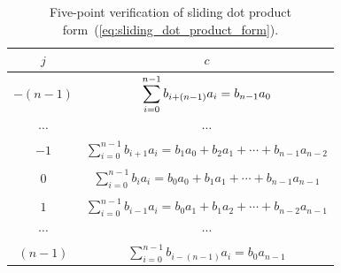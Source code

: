 \begin{table}[htb]
\label{tab:five_samples} 
\caption{Five-point verification of sliding dot product
form~(\ref{eq:sliding_dot_product_form}).}
\centering
\begin{tabular}{|c|c|}
\hline
$j$ & $c$ \\ \hline\hline
$-(n-1)$ & 
  $\displaystyle\sum_{i=0}^{n-1} 
    b_{i+(n-1)} a_i = b_{n-1} a_0$ \\  
$\cdots$ & $\cdots$ \\
$-1$ & 
  $\sum_{i=0}^{n-1} 
             b_{i+1} a_i = b_1 a_0 + b_2 a_1 + \cdots + 
	     b_{n-1} a_{n-2}$ \\  
	     & \\
$0$ & 
  $\sum_{i=0}^{n-1} b_i a_i = b_0 a_0 + b_1 a_1 + \cdots + 
  b_{n-1} a_{n-1}$ \\
  & \\
$1$ & 
  $\sum_{i=0}^{n-1} 
             b_{i-1} a_i = b_0 a_1 + b_1 a_2 + \cdots + 
	     b_{n-2} a_{n-1}$ \\  
$\cdots$ & $\cdots$ \\
$(n-1)$ & 
  $\sum_{i=0}^{n-1} b_{i-(n-1)} a_i = b_0 a_{n-1}$   
 \\ \hline
\end{tabular}
\end{table}

